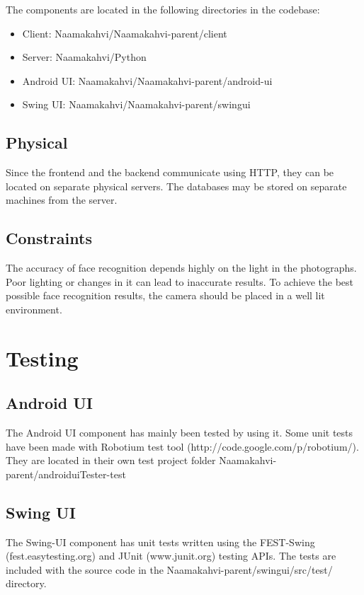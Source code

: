\documentclass[11pt]{article}
\begin{document}
The components are located in the following directories in the codebase:
\begin{itemize}
\item Client: Naamakahvi/Naamakahvi-parent/client

\item Server: Naamakahvi/Python

\item Android UI: Naamakahvi/Naamakahvi-parent/android-ui

\item Swing UI: Naamakahvi/Naamakahvi-parent/swingui
\end{itemize}


\subsection{Physical}

Since the frontend and the backend communicate using HTTP, they can be
located on separate physical servers. The databases may be stored on separate
machines from the server.%

\subsection{Constraints}
The accuracy of face recognition depends highly on the light in the 
photographs. Poor lighting or changes in it can lead to inaccurate results.
To achieve the best possible face recognition results, the camera should be 
placed in a well lit environment.

\section{Testing}

\subsection{Android UI}
The Android UI component has mainly been tested by using it. Some unit tests have been made
with Robotium test tool (http://code.google.com/p/robotium/). They are located in their own
test project folder Naamakahvi-parent/androiduiTester-test

\subsection{Swing UI}
The Swing-UI component has unit tests written using the FEST-Swing (fest.easytesting.org)
and JUnit (www.junit.org) testing APIs. The tests are included with the source code in the
Naamakahvi-parent/swingui/src/test/ directory. 
\end{document}
